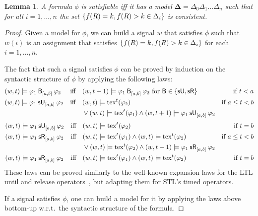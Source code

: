 \documentclass[acmsmall,screen]{acmart}
\newtheorem{lemma}{Lemma}
\begin{document}
\begin{lemma}
\label{lemma:model}
A formula $\phi$ is satisfiable iff it has a model $\mathbf{\Delta} = \Delta_0 \Delta_1 \dots \Delta_n$
such that for all $i = 1, \dots, n$ the set $\set{f(R) = k, f(R) > k \in \Delta_i}$ is consistent.
\end{lemma}
\begin{proof}
Given a model for $\phi$, we can build a signal $w$ that satisfies $\phi$ such that $w(i)$ is an assignment that satisfies
$\set{f(R) = k, f(R) > k \in \Delta_i}$ for each $i = 1, \dots, n$.

The fact that such a signal satisfies $\phi$ can be proved by induction on the syntactic structure of $\phi$
by applying the following laws:
\begin{align*}
&(w, t) \models \anybinop{[a,b]}{\varphi_1}{\varphi_2}
&&\text{iff}
&&(w, t+1) \models \anybinop{[a,b]}{\varphi_1}{\varphi_2}
\text{ for $\mathsf{B} \in \set{\suntilop, \sreleaseop}$}
&\text{if $t < a$} \\
&(w, t) \models \suntil{[a,b]}{\varphi_1}{\varphi_2}
&&\text{iff}
&&\begin{aligned}[t]
&(w, t) \models \exp^t(\varphi_2) \\
&\lor (w, t) \models \exp^t(\varphi_1) \land (w, t+1) \models \suntil{[a,b]}{\varphi_1}{\varphi_2}
\end{aligned}
&\text{if $a \leq t < b$} %
\end{align*}
\begin{align*}
&(w, t) \models \suntil{[a,b]}{\varphi_1}{\varphi_2}
&&\text{iff}
&&(w, t) \models \exp^t(\varphi_2)
&\text{if $t = b$} \\
&(w, t) \models \srelease{[a,b]}{\varphi_1}{\varphi_2}
&&\text{iff}
&&\begin{aligned}[t]
&(w, t) \models \exp^t(\varphi_1) \land (w, t) \models \exp^t(\varphi_2) \\
&\lor (w, t) \models \exp^t(\varphi_2) \land (w, t+1) \models \srelease{[a,b]}{\varphi_1}{\varphi_2}
\end{aligned}
&\text{if $a \leq t < b$} \\
&(w, t) \models \srelease{[a,b]}{\varphi_1}{\varphi_2}
&&\text{iff}
&&(w, t) \models \exp^t(\varphi_1) \land (w, t) \models \exp^t(\varphi_2)
&\text{if $t = b$}
\end{align*}
These laws can be proved similarly to the well-known expansion laws for the LTL until and release operators~\cite{BaierK08},
but adapting them for STL's timed operators.

If a signal satisfies $\phi$, one can build a model for it by applying the laws above bottom-up 
w.r.t.\ the syntactic structure of the formula.
\end{proof}
\end{document}
